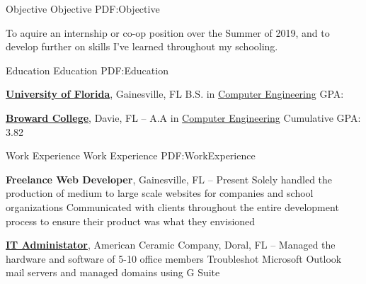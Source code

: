 \documentclass[a4paper,MMMyyyy,nonstopmode]{resume}
\newcommand{\CVAuthor}{Joseph Cortez}
\newcommand{\CVWebpage}{http://www.josephcortez.me/}
\begin{document}

\Title{\CVAuthor}


\begin{Body}


\Section
{Objective}
{Objective}
{PDF:Objective}

\Entry
To aquire an internship or co-op position over the Summer of 2019, and to develop further on skills I've learned throughout my schooling.


\Section
{Education}
{Education}
{PDF:Education}

\Entry
\href{http://www.ufl.edu}
{\textbf{University of Florida}},
Gainesville, FL
\hfill
{}
\Gap
\BulletItem
B.S. in
\href{http://www.cpe.eng.ufl.edu}
{Computer Engineering}
\BulletItem
GPA:

\BigGap
\Entry
\href{http://www.broward.edu}
{\textbf{Broward College}},
Davie, FL
\hfill
{} --
\Gap
\BulletItem
A.A in
\href{http://www.broward.edu/academics/programs/computer/capture/Pages/what-is-computer-science-and-engineering-.aspx}
{Computer Engineering}
\BulletItem
Cumulative GPA: 3.82


\Section
{Work\newline
Experience}
{Work Experience}
{PDF:WorkExperience}

\Entry
{\textbf{Freelance Web Developer}},
Gainesville, FL
\hfill
{} --
Present
\Gap
\BulletItem
Solely handled the production of medium to large scale websites for companies and school organizations
\BulletItem
Communicated with clients throughout the entire development process to ensure their product was what they envisioned

\BigGap
\Entry
\href{http://www.celimausa.com/usincel.com/About_Us.html}
{\textbf{IT Administator}}, 
American Ceramic Company,
Doral, FL
\hfill
{} --
\Gap
\BulletItem
Managed the hardware and software of 5-10 office members
\BulletItem
Troubleshot Microsoft Outlook mail servers and managed domains using G Suite


\end{Body}
\end{document}
